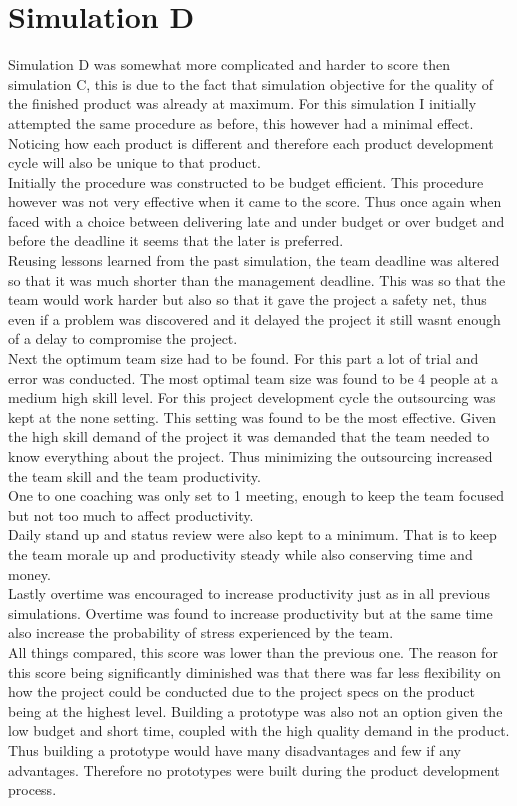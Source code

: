 \documentclass{article}
\begin{document}
\pagebreak


\section{Simulation D}
Simulation D was somewhat more complicated and harder to score then simulation C, this is due to the fact that simulation objective for the quality of the finished product was already at maximum. 
For this simulation I initially attempted the same procedure as before, this however had a minimal effect. \\
Noticing how each product is different and therefore each product development cycle will also be unique to that product.\\
Initially the procedure was constructed to be budget efficient. This procedure however was not very effective when it came to the score. Thus once again when faced with a choice between delivering late and under budget or over budget and before the deadline it seems that the later is preferred. \\
Reusing lessons learned from the past simulation,  the team deadline was altered so that it was much shorter than the management deadline. This was so that the team would work harder but also so that it gave the project a safety net, thus even if a problem was discovered and it delayed the project it still wasnt enough of a delay to compromise the project.\\
Next the optimum team size had to be found. For this part a lot of trial and error was conducted. The most optimal team size was found to be 4 people at a medium high skill level.
For this project development cycle the outsourcing was kept at the none setting. This setting was found to be the most effective. Given the high skill demand of the project it was demanded that the team needed to know everything about the project. Thus minimizing the outsourcing increased the team skill and the team productivity.\\
One to one coaching was only set to 1 meeting, enough to keep the team focused but not too much to affect productivity.\\
Daily stand up and status review were also kept to a minimum. That is to keep the team morale up and productivity steady while also conserving time and money.\\
Lastly overtime was encouraged to increase productivity just as in all previous simulations. Overtime was found to increase productivity but at the same time also increase the probability of stress experienced by the team.\\
All things compared, this score was lower than the previous one. The reason for this score being significantly diminished was that there was far less flexibility on how the project could be conducted due to the project specs on the product being at the highest level. Building  a prototype was also not an option given the low budget and short time, coupled with the high quality demand in the product. Thus building a prototype would have many disadvantages and few if any advantages. Therefore no prototypes were built during the product development process.
\end{document}
